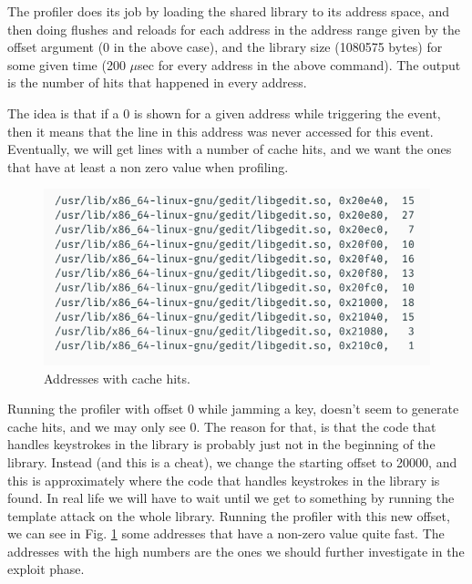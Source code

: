 The profiler does its job by loading the shared library to its address space, and then doing flushes and reloads for each address in the address range given by the offset argument (0 in the above case), and the library size (1080575 bytes) for some given time (200 $\mu$sec for every address in the above command). The output is the number of hits that happened in every address.

The idea is that if a 0 is shown for a given address while triggering the event, then it means that the line in this address was never accessed for this event. Eventually, we will get lines with a number of cache hits, and we want the ones that have at least a non zero value when profiling.

\begin{figure}[h]
    \centering
    \includegraphics[width=\textwidth]{images/profiling-cache-hits.png}
    \caption{Addresses with cache hits.}
    \label{profiling-cache-hits:fig}
\end{figure}

Running the profiler with offset 0 while jamming a key, doesn't seem to generate cache hits, and we may only see 0. The reason for that, is that the code that handles keystrokes in the library is probably just not in the beginning of the library. Instead (and this is a cheat), we change the starting offset to 20000, and this is approximately where the code that handles keystrokes in the library is found. In real life we will have to wait until we get to something by running the template attack on the whole library. Running the profiler with this new offset, we can see in Fig. \ref{profiling-cache-hits:fig} some addresses that have a non-zero value quite fast. The addresses with the high numbers are the ones we should further investigate in the exploit phase.


